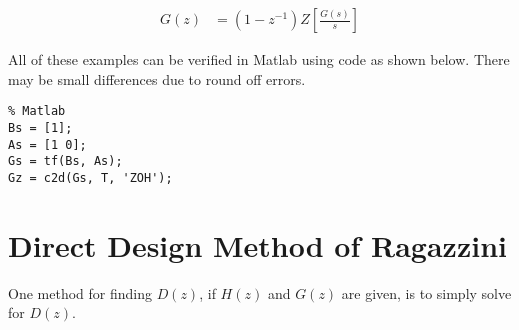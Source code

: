 \documentclass{article}
\newcommand{\sincludepdf}[2][]{
	
}
\begin{document}
\begin{align}
	G(z) &= (1 - z^{-1}) Z \left[ \frac{G(s)}{s} \right]
\end{align}

All of these examples can be verified in Matlab using
code as shown below.
There may be small differences due to round off errors.

\begin{lstlisting}
% Matlab
Bs = [1];
As = [1 0];
Gs = tf(Bs, As);
Gz = c2d(Gs, T, 'ZOH');
\end{lstlisting}

\sincludepdf[pages={8},
			pagecommand=\subsection*{Example 1}
	]{scan/11211301.pdf}

\sincludepdf[pages={6},
			pagecommand=\subsection*{Example 2}
		]{scan/11221301.pdf}
\sincludepdf[pages={7}]{scan/11221301.pdf}

\sincludepdf[pages={1},
			pagecommand=\subsection*{Example 3}
		]{scan/11221301.pdf}
\sincludepdf[pages={2}]{scan/11221301.pdf}

\sincludepdf[pages={1},
			pagecommand=\subsection*{Example 4}
		]{scan/11241301.pdf}
\sincludepdf[pages={2}]{scan/11241301.pdf}

\sincludepdf[pages={1},
			pagecommand=\subsection*{Example 5}
		]{scan/11251301.pdf}
\sincludepdf[pages={2}]{scan/11251301.pdf}


\section{Direct Design Method of Ragazzini}

One method for finding $D(z)$, if $H(z)$ and $G(z)$ are given,
is to simply solve for $D(z)$\autocite[Pg. 265]{franklin1998digital}.
\end{document}
